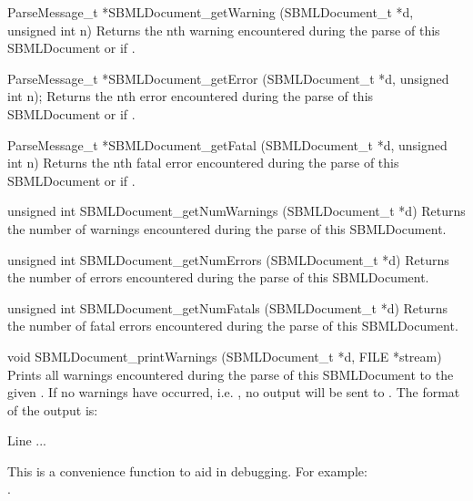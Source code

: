 \documentclass{sbmlmanual}
\begin{document}
\begin{methoddef}{ParseMessage\_t *SBMLDocument\_getWarning
(SBMLDocument\_t *d, unsigned int n)}
   Returns the nth warning encountered during the parse of this
   SBMLDocument or  if .
 \end{methoddef}

\begin{methoddef}{ParseMessage\_t *SBMLDocument\_getError (SBMLDocument\_t *d,
unsigned int n);}
   Returns the nth error encountered during the parse of this
   SBMLDocument or  if .
 \end{methoddef}

\begin{methoddef}{ParseMessage\_t *SBMLDocument\_getFatal (SBMLDocument\_t *d,
unsigned int n)}
   Returns the nth fatal error encountered during the parse of this
   SBMLDocument or  if .
 \end{methoddef}


\begin{methoddef}{unsigned int SBMLDocument\_getNumWarnings
(SBMLDocument\_t *d)}
   Returns the number of warnings encountered during the parse of this
   SBMLDocument.
 \end{methoddef}

\begin{methoddef}{unsigned int SBMLDocument\_getNumErrors (SBMLDocument\_t *d)}
   Returns the number of errors encountered during the parse of this
   SBMLDocument.
 \end{methoddef}

\begin{methoddef}{unsigned int SBMLDocument\_getNumFatals (SBMLDocument\_t *d)}
   Returns the number of fatal errors encountered during the parse of this
   SBMLDocument.
 \end{methoddef}
  

\begin{methoddef}{void SBMLDocument\_printWarnings (SBMLDocument\_t *d,
FILE *stream)}
  Prints all warnings encountered during the parse of this SBMLDocument to
  the given .  If no warnings have occurred, i.e.
  , no output will be sent to
  . The format of the output is:
  \begin{example}
      Line %
      ...
  \end{example}
  This is a convenience function to aid in debugging.  For example:\\
  .
 \end{methoddef}
  
\end{document}

